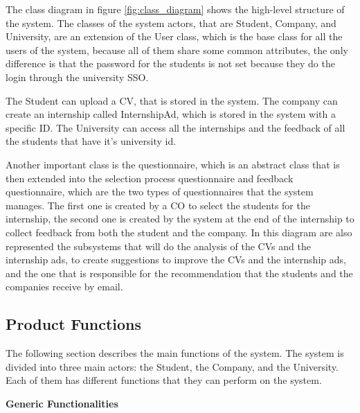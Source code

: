 \par The class diagram in figure \ref{fig:class_diagram} shows the high-level structure of the system. The classes of
the system actors, that are Student, Company, and University, are an extension of the User class, which is the base
class for all the users of the system, because all of them share some common attributes, the only difference is that
the password for the students is not set because they do the login through the university SSO.

\par The Student can upload a CV, that is stored in the system. The company can create an internship called
InternshipAd, which is stored in the system with a specific ID. The University can access all the internships and the
feedback of all the students that have it's university id.

\par Another important class is the questionnaire, which is an abstract class that is then extended into the selection
process questionnaire and feedback questionnaire, which are the two types of questionnaires that the system manages.
The first one is created by a CO to select the students for the internship, the second one is created by the system at
the end of the internship to collect feedback from both the student and the company. In this diagram are also
represented the subsystems that will do the analysis of the CVs and the internship ads, to create suggestions to
improve the CVs and the internship ads, and the one that is responsible for the recommendation that the students and
the companies receive by email.

\subsection{Product Functions}
\label{sec:product_functions}%

The following section describes the main functions of the system. 
The system is divided into three main actors: the Student, the Company, and the University. 
Each of them has different functions that they can perform on the system.\\

\par\textbf{Generic Functionalities}

